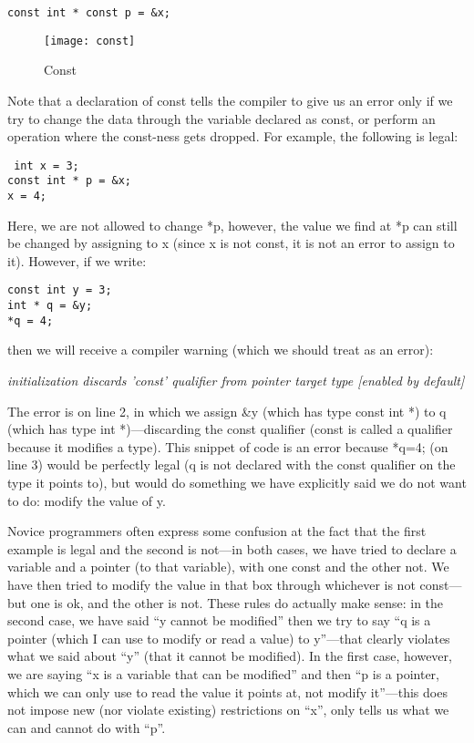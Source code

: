 \documentclass[11pt, a4paper]{article}
\begin{document}
\texttt{const int * const p = \&x;} 


\begin{figure}[htpb]
  \centering
  \texttt{[image: const]}
  \caption{Const}
  \label{fig:const}
\end{figure}

Note that a declaration of const tells the compiler to give us an error only if we try to change the data through the variable declared as const, or perform an operation where the const-ness gets dropped. For example, the following is legal:

\texttt{ int x = 3;}\\ 
\texttt{const int * p = \&x;} \\
\texttt{x = 4;} 


Here, we are not allowed to change *p, however, the value we find at *p can still be changed by assigning to x (since x is not const, it is not an error to assign to it). However, if we write:


\texttt{const int y = 3;} \\
\texttt{int * q = \&y;} \\
\texttt{*q = 4;} 

then we will receive a compiler warning (which we should treat as an error):

\textit{initialization discards 'const' qualifier from pointer target type [enabled by default]}


The error is on line 2, in which we assign \&y (which has type const int *) to q (which has type int *)—discarding the const qualifier (const is called a qualifier because it modifies a type). This snippet of code is an error because *q=4; (on line 3) would be perfectly legal (q is not declared with the const qualifier on the type it points to), but would do something we have explicitly said we do not want to do: modify the value of y.

Novice programmers often express some confusion at the fact that the first example is legal and the second is not—in both cases, we have tried to declare a variable and a pointer (to that variable), with one const and the other not. We have then tried to modify the value in that box through whichever is not const—but one is ok, and the other is not. These rules do actually make sense: in the second case, we have said “y cannot be modified” then we try to say “q is a pointer (which I can use to modify or read a value) to y”—that clearly violates what we said about “y” (that it cannot be modified). In the first case, however, we are saying “x is a variable that can be modified” and then “p is a pointer, which we can only use to read the value it points at, not modify it”—this does not impose new (nor violate existing) restrictions on “x”, only tells us what we can and cannot do with “p”.
\end{document}
